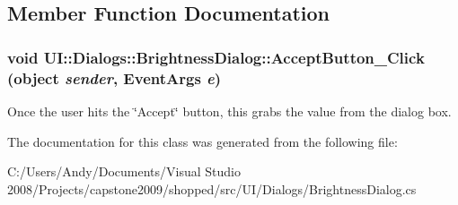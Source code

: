 \subsection{Member Function Documentation}
\hypertarget{class_u_i_1_1_dialogs_1_1_brightness_dialog_a62c4999f69f1f50776ee4a674c73ed95}{
\subsubsection[{AcceptButton\_\-Click}]{\setlength{\rightskip}{0pt plus 5cm}void UI::Dialogs::BrightnessDialog::AcceptButton\_\-Click (object {\em sender}, \/  EventArgs {\em e})}}
\label{class_u_i_1_1_dialogs_1_1_brightness_dialog_a62c4999f69f1f50776ee4a674c73ed95}
Once the user hits the \char`\"{}Accept\char`\"{} button, this grabs the value from the dialog box. 

The documentation for this class was generated from the following file:\begin{DoxyCompactItemize}
\item 
C:/Users/Andy/Documents/Visual Studio 2008/Projects/capstone2009/shopped/src/UI/Dialogs/BrightnessDialog.cs\end{DoxyCompactItemize}
